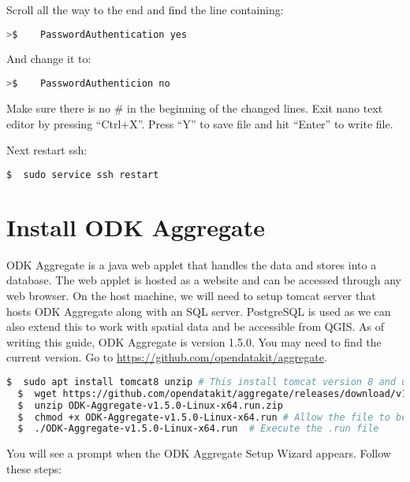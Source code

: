 \noindent
Scroll all the way to the end and find the line containing:

\begin{lstlisting}[language=bash]
  >$    PasswordAuthentication yes
\end{lstlisting}

\noindent
And change it to:

\begin{lstlisting}[language=bash]
  >$    PasswordAuthenticion no
\end{lstlisting}

\noindent
Make sure there is no \# in the beginning of the changed lines. Exit nano text editor by pressing ``Ctrl+X''. Press ``Y'' to save file and hit ``Enter'' to write file.

\noindent
Next restart ssh:

\begin{lstlisting}[language=bash]
  $  sudo service ssh restart
\end{lstlisting}

\section*{Install ODK Aggregate}

\noindent
ODK Aggregate is a java web applet that handles the data and stores into a database. The web applet is hosted as a website and can be accessed through any web browser. On the host machine, we will need to setup tomcat server that hosts ODK Aggregate along with an SQL server. PostgreSQL is used as we can also extend this to work with spatial data and be accessible from QGIS. As of writing this guide, ODK Aggregate is version 1.5.0. You may need to find the current version. Go to \url{https://github.com/opendatakit/aggregate}.

\begin{lstlisting}[language=bash, breaklines=true]
  $  sudo apt install tomcat8 unzip # This install tomcat version 8 and unzip to allow us to extract .zip files
  $  wget https://github.com/opendatakit/aggregate/releases/download/v1.5.0/ODK-Aggregate-v1.5.0-Linux-x64.run.zip
  $  unzip ODK-Aggregate-v1.5.0-Linux-x64.run.zip
  $  chmod +x ODK-Aggregate-v1.5.0-Linux-x64.run # Allow the file to be executable
  $  ./ODK-Aggregate-v1.5.0-Linux-x64.run  # Execute the .run file
\end{lstlisting}

\noindent
You will see a prompt when the ODK Aggregate Setup Wizard appears. Follow these steps:

